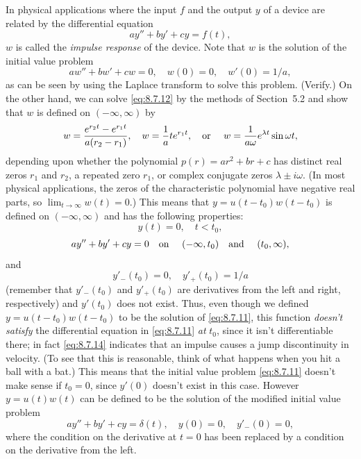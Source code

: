 In physical applications where the input $f$ and the output $y$ of a device are related by the
differential equation
\[
  ay''+by'+cy=f(t),
\]
$w$ is called the {\color{blue}\it impulse response\/} of the device. Note that $w$ is the solution
of the initial value problem
\begin{equation}
  \label{eq:8.7.12}aw''+bw'+cw=0,\quad w(0)=0,\quad w'(0)=1/a,
\end{equation}
as can be seen by using the Laplace transform to solve this problem. (Verify.) On the other hand, we
can solve \eqref{eq:8.7.12} by the methods of Section~5.2 and show that $w$ is defined on
$(-\infty,\infty)$ by
\begin{equation}
  \label{eq:8.7.13}w=\frac{e^{r_{2}t}-e^{r_{1}t}}{a(r_{2}-r_{1})},\quad w=\frac{1}{a}te^{r_{1}t},\mbox{\quad or \quad}w=\frac{1}{a\omega}e^{\lambda t}\sin\omega t,
\end{equation}
depending upon whether the polynomial $p(r)=ar^{2}+br+c$ has distinct real zeros $r_{1}$ and
$r_{2}$, a repeated zero $r_{1}$, or complex conjugate zeros $\lambda\pm i\omega$. (In most physical
applications, the zeros of the characteristic polynomial have negative real parts, so
$\lim_{t\to\infty}w(t)=0$.) This means that $y=u(t-t_{0})w(t-t_{0})$ is defined on
$(-\infty,\infty)$ and has the following properties:
\[
  y(t)=0,\quad t<t_{0},
\]
\[
  ay''+by'+cy=0\mbox{\quad on \quad }(-\infty,t_{0})\mbox{\quad and \quad}(t_{0},\infty),
\]
and
\begin{equation}
  \label{eq:8.7.14}y'_{-}(t_{0})=0,\quad y'_{+}(t_{0})=1/a
\end{equation}
(remember that $y'_{-}(t_{0})$ and $y'_{+}(t_{0})$ are derivatives from the left and right,
respectively) and $y'(t_{0})$ does not exist. Thus, even though we defined $y=u(t-t_{0})w(t-t_{0})$
to be the solution of \eqref{eq:8.7.11}, this function {\color{blue}\it doesn't satisfy\/} the
differential equation in \eqref{eq:8.7.11} {\color{blue}\it at\/} $t_{0}$, since it isn't
differentiable there; in fact \eqref{eq:8.7.14} indicates that an impulse causes a jump
discontinuity in velocity. (To see that this is reasonable, think of what happens when you hit a
ball with a bat.) This means that the initial value problem \eqref{eq:8.7.11} doesn't make sense if
$t_{0}=0$, since $y'(0)$ doesn't exist in this case. However $y=u(t)w(t)$ can be defined to be the
solution of the modified initial value problem
\[
  ay''+by'+cy=\delta(t),\quad y(0)=0,\quad y'_{-}(0)=0,
\]
where the condition on the derivative at $t=0$ has been replaced by a condition on the derivative
from the left.

